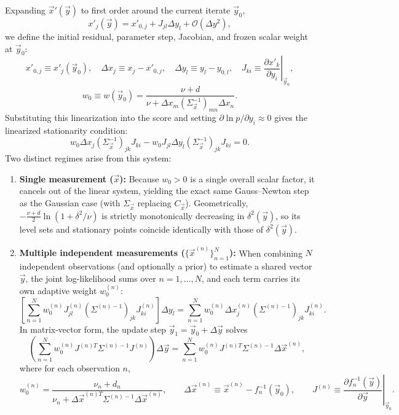 \documentclass[11pt, a4paper]{article}
\begin{document}
Expanding $\vec{x}'(\vec{y})$ to first order around the current iterate $\vec{y}_0$,
\begin{equation}
x'_j(\vec{y}) = x'_{0,j} + J_{jl} \Delta y_l + \mathcal{O}(\Delta y^2),
\end{equation}
we define the initial residual, parameter step, Jacobian, and frozen scalar weight at $\vec{y}_0$:
\begin{equation}
x'_{0,j} \equiv x'_j(\vec{y}_0), \quad \Delta x_j \equiv x_j - x'_{0,j}, \quad \Delta y_l \equiv y_l - y_{0,l}, \quad J_{ki} \equiv \left.\frac{\partial x'_k}{\partial y_i}\right|_{\vec{y}_0},
\end{equation}
\begin{equation}
w_0 \equiv w(\vec{y}_0) = \frac{\nu + d}{\nu + \Delta x_m (\Sigma_{\vec{x}}^{-1})_{mn} \Delta x_n}.
\end{equation}
Substituting this linearization into the score and setting $\partial \ln p / \partial y_i \approx 0$ gives the linearized stationarity condition:
\begin{equation}
w_0 \Delta x_j (\Sigma_{\vec{x}}^{-1})_{jk} J_{ki} - w_0 J_{jl} \Delta y_l (\Sigma_{\vec{x}}^{-1})_{jk} J_{ki} = 0.
\end{equation}
Two distinct regimes arise from this system:
\begin{enumerate}
\item \textbf{Single measurement ($\vec{x}$):} Because $w_0 > 0$ is a single overall scalar factor, it cancels out of the linear system, yielding the exact same Gauss--Newton step as the Gaussian case (with $\Sigma_{\vec{x}}$ replacing $C_{\vec{x}}$). Geometrically, $-\frac{\nu + d}{2}\ln(1 + \delta^2/\nu)$ is strictly monotonically decreasing in $\delta^2(\vec{y})$, so its level sets and stationary points coincide identically with those of $\delta^2(\vec{y})$.
\item \textbf{Multiple independent measurements ($\{\vec{x}^{(n)}\}_{n=1}^N$):} When combining $N$ independent observations (and optionally a prior) to estimate a shared vector $\vec{y}$, the joint log-likelihood sums over $n = 1, \dots, N$, and each term carries its own adaptive weight $w_0^{(n)}$:
\begin{equation}
\left[ \sum_{n=1}^N w_0^{(n)} J_{jl}^{(n)} \left(\Sigma^{(n)-1}\right)_{jk} J_{ki}^{(n)} \right] \Delta y_l = \sum_{n=1}^N w_0^{(n)} \Delta x_j^{(n)} \left(\Sigma^{(n)-1}\right)_{jk} J_{ki}^{(n)}.
\end{equation}
In matrix-vector form, the update step $\vec{y}_1 = \vec{y}_0 + \Delta \vec{y}$ solves
\begin{equation}
\left( \sum_{n=1}^N w_0^{(n)} J^{(n)T} \Sigma^{(n)-1} J^{(n)} \right) \Delta \vec{y} = \sum_{n=1}^N w_0^{(n)} J^{(n)T} \Sigma^{(n)-1} \Delta \vec{x}^{(n)},
\end{equation}
where for each observation $n$,
\begin{equation}
w_0^{(n)} = \frac{\nu_n + d_n}{\nu_n + \Delta \vec{x}^{(n)T} \Sigma^{(n)-1} \Delta \vec{x}^{(n)}}, \qquad \Delta \vec{x}^{(n)} \equiv \vec{x}^{(n)} - f_n^{-1}(\vec{y}_0), \qquad J^{(n)} \equiv \left.\frac{\partial f_n^{-1}(\vec{y})}{\partial \vec{y}}\right|_{\vec{y}_0}.
\end{equation}
\end{enumerate}
\end{document}
